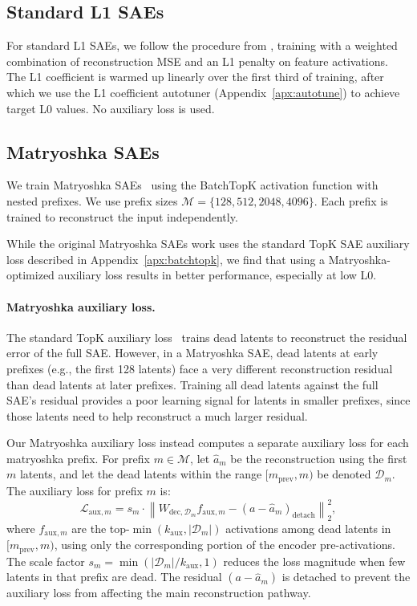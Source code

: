 \documentclass{article}
\theoremstyle{plain}
\theoremstyle{definition}
\theoremstyle{remark}
\newcommand{\dec}{\text{dec}}
\newcommand{\aux}{\text{aux}}
\begin{document}
\subsection{Standard L1 SAEs}
\label{apx:l1}

For standard L1 SAEs, we follow the procedure from \citet{olah2024april}, training with a weighted combination of reconstruction MSE and an L1 penalty on feature activations. The L1 coefficient is warmed up linearly over the first third of training, after which we use the L1 coefficient autotuner (Appendix~\ref{apx:autotune}) to achieve target L0 values. No auxiliary loss is used.

\subsection{Matryoshka SAEs}
\label{apx:matryoshka}

We train Matryoshka SAEs~\citep{bussmann2025learning} using the BatchTopK activation function with nested prefixes. We use prefix sizes $\mathcal{M} = \{128, 512, 2048, 4096\}$. Each prefix is trained to reconstruct the input independently.

While the original Matryoshka SAEs work uses the standard TopK SAE auxiliary loss described in Appendix~\ref{apx:batchtopk}, we find that using a Matryoshka-optimized auxiliary loss results in better performance, especially at low L0.

\paragraph{Matryoshka auxiliary loss.} The standard TopK auxiliary loss~\citep{gao2024scaling} trains dead latents to reconstruct the residual error of the full SAE. However, in a Matryoshka SAE, dead latents at early prefixes (e.g., the first 128 latents) face a very different reconstruction residual than dead latents at later prefixes. Training all dead latents against the full SAE's residual provides a poor learning signal for latents in smaller prefixes, since those latents need to help reconstruct a much larger residual.

Our Matryoshka auxiliary loss instead computes a separate auxiliary loss for each matryoshka prefix. For prefix $m \in \mathcal{M}$, let $\hat{a}_m$ be the reconstruction using the first $m$ latents, and let the dead latents within the range $[m_{\text{prev}}, m)$ be denoted $\mathcal{D}_m$. The auxiliary loss for prefix $m$ is:
\begin{equation}
    \mathcal{L}_{\aux,m} = s_m \cdot \left\| W_{\dec,\mathcal{D}_m} f_{\aux,m} - (a - \hat{a}_m)_{\text{detach}} \right\|_2^2,
\end{equation}
where $f_{\aux,m}$ are the top-$\min(k_{\aux}, |\mathcal{D}_m|)$ activations among dead latents in $[m_{\text{prev}}, m)$, using only the corresponding portion of the encoder pre-activations. The scale factor $s_m = \min(|\mathcal{D}_m| / k_{\aux}, 1)$ reduces the loss magnitude when few latents in that prefix are dead. The residual $(a - \hat{a}_m)$ is detached to prevent the auxiliary loss from affecting the main reconstruction pathway.
\end{document}
